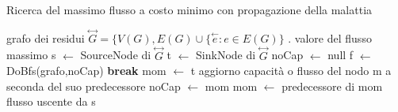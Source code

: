 \documentclass{article}
\begin{document}
\begin{algorithm}
\caption{Ricerca del massimo flusso a costo minimo con propagazione della malattia}
\begin{algorithmic}
\REQUIRE grafo dei residui $\overset{\leftrightarrow}{G} = \{V(G),E(G) \cup \{ \overset{\leftarrow}{e} : e \in E(G) \}$ .
\ENSURE valore del flusso massimo
\STATE s $\leftarrow$ SourceNode di $\overset{\leftrightarrow}{G}$
\STATE t $\leftarrow$ SinkNode di $\overset{\leftrightarrow}{G}$
\STATE noCap $\leftarrow$ null
\LOOP
\STATE f $\leftarrow$ DoBfs(grafo,noCap)
\STATE \textbf{break}
\ENDIF
\STATE mom $\leftarrow$ t
\STATE aggiorno capacità o flusso del nodo m a seconda del suo predecessore
\STATE noCap $\leftarrow$ mom
\ENDIF
\STATE mom $\leftarrow$ predecessore di mom
\ENDWHILE
\ENDLOOP
\RETURN flusso uscente da s
\end{algorithmic}
\end{algorithm}
\end{document}
